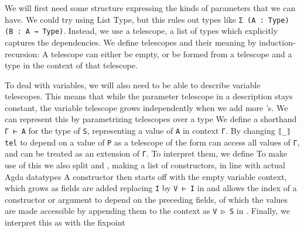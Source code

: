 We will first need some structure expressing the kinds of parameters that we can have. We could try using List Type, but this rules out types like \texttt{Σ (A : Type) (B : A → Type)}. Instead, we use a telescope, a list of types which explicitly captures the dependencies. We define telescopes and their meaning by induction-recursion:
A telescope can either be empty, or be formed from a telescope and a type in the context of that telescope.

To deal with variables, we will also need to be able to describe variable telescopes. This means that while the parameter telescope in a description stays constant, the variable telescope grows independently when we add more 's. We can represent this by parametrizing telescopes over a type
We define a shorthand \texttt{Γ ⊢ A} for the type of \texttt{S}, representing a value of \texttt{A} in context \texttt{Γ}. By changing \texttt{⟦\_⟧tel} to depend on a value of \texttt{P} as
a telescope of the form
can access all values of \texttt{Γ}, and can be treated as an extension of \texttt{Γ}. To interpret them, we define
To make use of this we also split  and , making  a list of constructors, in line with actual Agda datatypes
A constructor then starts off with the empty variable context, which grows as fields are added
replacing \texttt{I} by \texttt{V ⊢ I} in  and  allows the index of a constructor or argument to depend on the preceding fields, of which the values are made accessible by appending them to the context as \texttt{V ▷ S} in . Finally, we interpret this as
with the fixpoint
